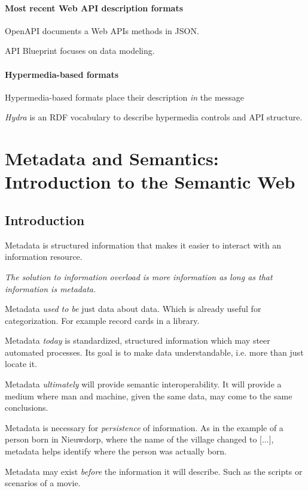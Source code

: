 \documentclass{report}
\begin{document}
\subsubsection{Most recent Web API description formats}

OpenAPI documents a Web APIs methods in JSON.

API Blueprint focuses on data modeling.

\subsubsection{Hypermedia-based formats}

Hypermedia-based formats place
their description \emph{in} the message

\emph{Hydra} is an RDF vocabulary
to describe hypermedia controls and API structure.

\chapter{Metadata and Semantics: Introduction to the Semantic Web}

\section{Introduction}

Metadata is structured information
that makes it easier to interact
with an information resource.

\textit{
  The solution to information overload is more information
  as long as that information is metadata.
}

Metadata \emph{used to be} just data about data.
Which is already useful for categorization.
For example record cards in a library.

Metadata \emph{today} is standardized, structured information
which may steer automated processes.
Its goal is to make data understandable,
i.e. more than just locate it.

Metadata \emph{ultimately} will provide semantic interoperability.
It will provide a medium where man and machine,
given the same data, may come to the same conclusions.

Metadata is necessary for \emph{persistence} of information.
As in the example of a person born in Nieuwdorp,
where the name of the village changed to [...],
metadata helps identify where the person was actually born.

Metadata may exist \emph{before} the information it will describe.
Such as the scripts or scenarios of a movie.
\end{document}
